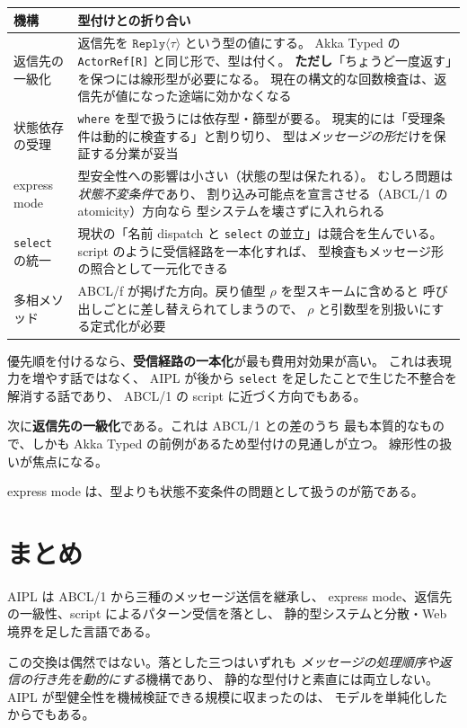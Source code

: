 \documentclass[11pt,a4paper]{ltjsarticle}
\theoremstyle{remark}
\newcommand{\ty}[1]{\ensuremath{\mathtt{#1}}}
\begin{document}
\begin{center}
\small
\begin{tabular}{@{}lp{9.6cm}@{}}
\toprule
機構 & 型付けとの折り合い \\
\midrule
返信先の一級化 &
  返信先を \ty{Reply}$\langle\tau\rangle$ という型の値にする。
  Akka Typed の \texttt{ActorRef[R]} と同じ形で、型は付く。
  \textbf{ただし}「ちょうど一度返す」を保つには線形型が必要になる。
  現在の構文的な回数検査は、返信先が値になった途端に効かなくなる \\
状態依存の受理 &
  \texttt{where} を型で扱うには依存型・篩型が要る。
  現実的には「受理条件は動的に検査する」と割り切り、
  型は\emph{メッセージの形}だけを保証する分業が妥当 \\
express mode &
  型安全性への影響は小さい（状態の型は保たれる）。
  むしろ問題は\emph{状態不変条件}であり、
  割り込み可能点を宣言させる（ABCL/1 の atomicity）方向なら
  型システムを壊さずに入れられる \\
\texttt{select} の統一 &
  現状の「名前 dispatch と \texttt{select} の並立」は競合を生んでいる。
  script のように受信経路を一本化すれば、
  型検査もメッセージ形の照合として一元化できる \\
多相メソッド &
  ABCL/f が掲げた方向。戻り値型 $\rho$ を型スキームに含めると
  呼び出しごとに差し替えられてしまうので、
  $\rho$ と引数型を別扱いにする定式化が必要 \\
\bottomrule
\end{tabular}
\end{center}

優先順を付けるなら、\textbf{受信経路の一本化}が最も費用対効果が高い。
これは表現力を増やす話ではなく、
AIPL が後から \texttt{select} を足したことで生じた不整合を解消する話であり、
ABCL/1 の script に近づく方向でもある。

次に\textbf{返信先の一級化}である。これは ABCL/1 との差のうち
最も本質的なもので、しかも Akka Typed の前例があるため型付けの見通しが立つ。
線形性の扱いが焦点になる。

express mode は、型よりも状態不変条件の問題として扱うのが筋である。

\section{まとめ}

AIPL は ABCL/1 から三種のメッセージ送信を継承し、
express mode、返信先の一級性、script によるパターン受信を落とし、
静的型システムと分散・Web 境界を足した言語である。

この交換は偶然ではない。落とした三つはいずれも
\emph{メッセージの処理順序や返信の行き先を動的にする}機構であり、
静的な型付けと素直には両立しない。
AIPL が型健全性を機械検証できる規模に収まったのは、
モデルを単純化したからでもある。
\end{document}
